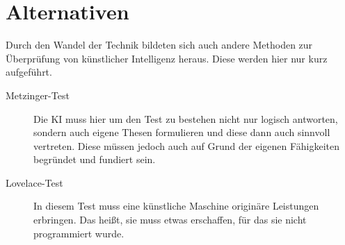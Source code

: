 \section{Alternativen}
Durch den Wandel der Technik bildeten sich auch andere Methoden zur Überprüfung von künstlicher Intelligenz heraus. Diese werden hier nur kurz aufgeführt. 
\begin{description}
	\item[Metzinger-Test]
		Die KI muss hier um den Test zu bestehen nicht nur logisch antworten, sondern auch eigene Thesen formulieren und diese dann auch sinnvoll vertreten. Diese müssen jedoch auch auf Grund der eigenen Fähigkeiten begründet und fundiert sein. 
	\item[Lovelace-Test] In diesem Test muss eine künstliche Maschine originäre Leistungen erbringen. Das heißt, sie muss etwas erschaffen, für das sie nicht programmiert wurde. 
\end{description}

